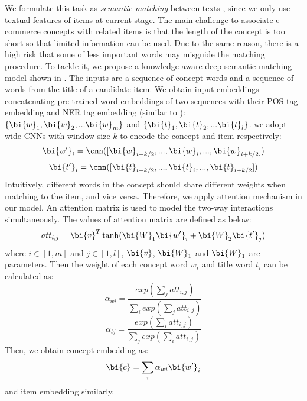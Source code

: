 We formulate this task as \textit{semantic matching} between texts \cite{huang2013learning,pang2016text,yang2019simple}, since we only use textual features of items at current stage. 
The main challenge to associate e-commerce concepts with related items is that the length of the concept is too short so that limited information can be used.
Due to the same reason, there is a high risk that some of less important words may misguide the matching procedure.
To tackle it, we propose a knowledge-aware deep semantic matching model shown in .
The inputs are a sequence of concept words and a sequence of words from the title of a candidate item.
We obtain input embeddings concatenating pre-trained word embeddings of two sequences with their POS tag embedding and NER tag embedding (similar to ):
$\{\bi{w}_1, \bi{w}_2,...\bi{w}_m\}$
and 
$\{\bi{t}_1, \bi{t}_2,...\bi{t}_l\}$.
we adopt wide CNNs with window size $k$ to encode the concept and item respectively:
\begin{equation}
\bi{w'}_i = \cnn([\bi{w}_{i-k/2}, ..., \bi{w}_i, ..., \bi{w}_{i+k/2}])
\end{equation}
\begin{equation}
\bi{t'}_i = \cnn([\bi{t}_{i-k/2}, ..., \bi{t}_i, ..., \bi{t}_{i+k/2}])
\end{equation}
Intuitively, different words in the concept should share different weights when matching to the item, and vice versa.
Therefore, we apply attention mechanism \cite{bahdanau2014neural,luong2015effective} in our model.
An attention matrix is used to model the two-way interactions simultaneously. 
The values of attention matrix are defined as below:
\begin{equation}
att_{i,j} = \bi{v}^T\tanh(\bi{W}_1\bi{w'}_i+\bi{W}_2\bi{t'}_j)
\end{equation}
where $i \in [1, m]$ and $j \in [1, l]$, $\bi{v}$, $\bi{W}_1$ and $\bi{W}_1$ are parameters.
Then the weight of each concept word $w_i$ and title word $t_i$ can be calculated as:
\begin{equation}
	\alpha_{wi} = \frac{exp(\sum_{j}att_{i,j})}{\sum_{i}exp(\sum_{j}att_{i,j})}
\end{equation}
\begin{equation}
\alpha_{tj} = \frac{exp(\sum_{i}att_{i,j})}{\sum_{j}exp(\sum_{i}att_{i,j})}
\end{equation}
Then, we obtain concept embedding  as:
\begin{equation}
	\bi{c} = \sum_{i}\alpha_{wi}\bi{w'}_i
\end{equation}
and item embedding  similarly.

